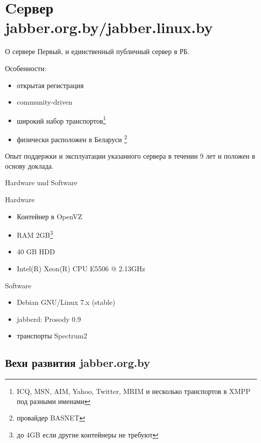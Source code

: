 \section{Ceрвер jabber.org.by/jabber.linux.by}
\begin{frame}{О сервере}
  Первый, и единственный публичный сервер в РБ.

  Особенности:
  \begin{itemize}
      \item открытая регистрация
      \item community-driven
      \item широкий набор транспортов\footnote{ICQ, MSN, AIM, Yahoo, Twitter, MRIM и несколько транспортов в XMPP под разными именами}
      \item физически расположен в Беларуси \footnote{провайдер BASNET} 
  \end{itemize}

  Опыт поддержки и эксплуатации указанного сервера в течении 9 лет и положен в основу доклада.
\end{frame}

\begin{frame}{Hardware und Software}

  \begin{block}{Hardware} 
    \begin{itemize}
      \item Контейнер в OpenVZ
      \item RAM 2GB\footnote{до 4GB если другие контейнеры не требуют}  
      \item 40 GB HDD
      \item Intel(R) Xeon(R) CPU E5506  @ 2.13GHz  
    \end{itemize} 
  \end{block}
 
  \pause
  
  \begin{block}{Software}
    \begin{itemize}
      \item Debian GNU/Linux 7.x (stable)
      \item jabberd: Prosody 0.9
      \item транспорты Spectrum2
    \end{itemize}
  \end{block}
\end{frame}

\subsection{Вехи развития jabber.org.by}

